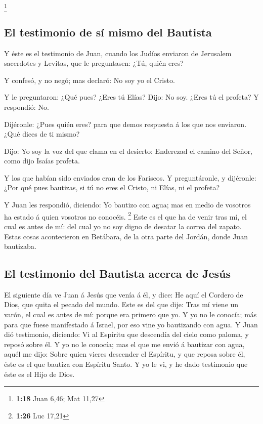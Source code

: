 \footnote{\textbf{1:18} Juan 6,46; Mat 11,27}

\hypertarget{el-testimonio-de-suxed-mismo-del-bautista}{%
\subsection{El testimonio de sí mismo del
Bautista}\label{el-testimonio-de-suxed-mismo-del-bautista}}

 Y éste es el testimonio de Juan, cuando los Judíos
enviaron de Jerusalem sacerdotes y Levitas, que le preguntasen: ¿Tú,
quién eres?

 Y confesó, y no negó; mas declaró: No soy yo el Cristo.

 Y le preguntaron: ¿Qué pues? ¿Eres tú Elías? Dijo: No soy.
¿Eres tú el profeta? Y respondió: No.~

 Dijéronle: ¿Pues quién eres? para que demos respuesta á
los que nos enviaron. ¿Qué dices de ti mismo?

 Dijo: Yo soy la voz del que clama en el desierto:
Enderezad el camino del Señor, como dijo Isaías profeta.

 Y los que habían sido enviados eran de los Fariseos.
 Y preguntáronle, y dijéronle: ¿Por qué pues bautizas, si
tú no eres el Cristo, ni Elías, ni el profeta?

 Y Juan les respondió, diciendo: Yo bautizo con agua; mas
en medio de vosotros ha estado á quien vosotros no conocéis. \footnote{\textbf{1:26}
  Luc 17,21}  Este es el que ha de venir tras mí, el cual
es antes de mí: del cual yo no soy digno de desatar la correa del
zapato.  Estas cosas acontecieron en Betábara, de la otra
parte del Jordán, donde Juan bautizaba.

\hypertarget{el-testimonio-del-bautista-acerca-de-jesuxfas}{%
\subsection{El testimonio del Bautista acerca de
Jesús}\label{el-testimonio-del-bautista-acerca-de-jesuxfas}}

 El siguiente día ve Juan á Jesús que venía á él, y dice:
He aquí el Cordero de Dios, que quita el pecado del mundo. 
Este es del que dije: Tras mí viene un varón, el cual es antes de mí:
porque era primero que yo.  Y yo no le conocía; más para
que fuese manifestado á Israel, por eso vine yo bautizando con agua.
 Y Juan dió testimonio, diciendo: Vi al Espíritu que
descendía del cielo como paloma, y reposó sobre él.  Y yo
no le conocía; mas el que me envió á bautizar con agua, aquél me dijo:
Sobre quien vieres descender el Espíritu, y que reposa sobre él, éste es
el que bautiza con Espíritu Santo.  Y yo le vi, y he dado
testimonio que éste es el Hijo de Dios.

